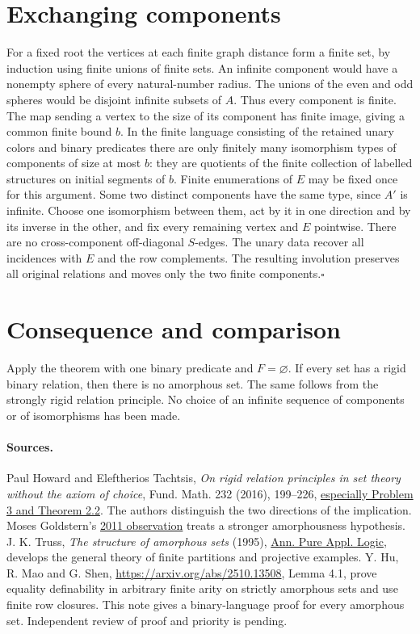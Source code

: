 \documentclass[11pt]{article}
\begin{document}
\section{Exchanging components}
For a fixed root the vertices at each finite graph distance form a finite set, by induction using finite unions of finite sets. An infinite component would have a nonempty sphere of every natural-number radius. The unions of the even and odd spheres would be disjoint infinite subsets of $A$. Thus every component is finite. The map sending a vertex to the size of its component has finite image, giving a common finite bound $b$. In the finite language consisting of the retained unary colors and binary predicates there are only finitely many isomorphism types of components of size at most $b$: they are quotients of the finite collection of labelled structures on initial segments of $b$. Finite enumerations of $E$ may be fixed once for this argument.
Some two distinct components have the same type, since $A'$ is infinite. Choose one isomorphism between them, act by it in one direction and by its inverse in the other, and fix every remaining vertex and $E$ pointwise. There are no cross-component off-diagonal $S$-edges. The unary data recover all incidences with $E$ and the row complements. The resulting involution preserves all original relations and moves only the two finite components.\hfill$\square$
\section{Consequence and comparison}
Apply the theorem with one binary predicate and $F=\varnothing$. If every set has a rigid binary relation, then there is no amorphous set. The same follows from the strongly rigid relation principle. No choice of an infinite sequence of components or of isomorphisms has been made.
\paragraph{Sources.} Paul Howard and Eleftherios Tachtsis, \emph{On rigid relation principles in set theory without the axiom of choice}, Fund. Math. 232 (2016), 199--226, \href{https://doi.org/10.4064/fm960-12-2015}{especially Problem 3 and Theorem 2.2}. The authors distinguish the two directions of the implication. Moses Goldstern's \href{https://mathoverflow.net/a/70732}{2011 observation} treats a stronger amorphousness hypothesis. J. K. Truss, \emph{The structure of amorphous sets} (1995), \href{https://www.sciencedirect.com/science/article/pii/016800729400024W}{Ann. Pure Appl. Logic}, develops the general theory of finite partitions and projective examples. Y. Hu, R. Mao and G. Shen, \url{https://arxiv.org/abs/2510.13508}, Lemma 4.1, prove equality definability in arbitrary finite arity on strictly amorphous sets and use finite row closures. This note gives a binary-language proof for every amorphous set. Independent review of proof and priority is pending.
\end{document}

